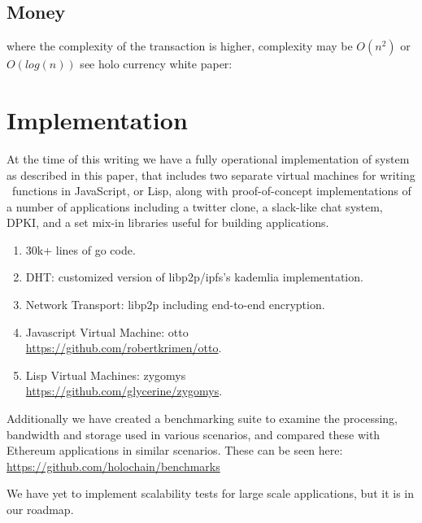 \documentclass[twocolumn,showpacs,
  nofootinbib,aps,superscriptaddress,
  eqsecnum,prd,notitlepage,showkeys,10pt]{revtex4-1}
\begin{document}
\subsection{Money}
where the complexity of the transaction is higher, complexity may be $O(n^2)$ or $O(log(n))$ see holo currency white paper: \cite{holocurrency}


\section{Implementation}
\label{sec:implementation}

At the time of this writing we have a fully operational implementation of system as described in this paper, that includes two separate virtual machines for writing \hcdna\ functions in JavaScript, or Lisp, along with proof-of-concept implementations of a number of applications including a twitter clone, a slack-like chat system, DPKI, and a set mix-in libraries useful for building applications.

\begin{enumerate}
\item 30k+ lines of go code.
\item DHT: customized version of libp2p/ipfs's kademlia implementation.
\item Network Transport: libp2p including end-to-end encryption.
\item Javascript Virtual Machine: otto \\\url{https://github.com/robertkrimen/otto}.
\item Lisp Virtual Machines: zygomys \\\url{https://github.com/glycerine/zygomys}.
\end{enumerate}

Additionally we have created a benchmarking suite to examine the processing, bandwidth and storage used in various scenarios, and compared these with Ethereum applications in similar scenarios.  These can be seen here: \\\url{https://github.com/holochain/benchmarks}

We have yet to implement scalability tests for large scale applications, but it is in our roadmap.

\appendix
\end{document}
